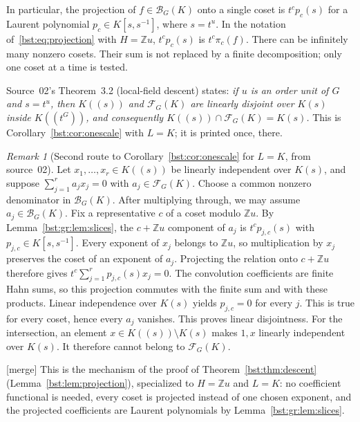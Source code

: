 \documentclass[11pt,letterpaper]{article}
\theoremstyle{definition}
\theoremstyle{remark}
\newtheorem{remark}[theorem]{Remark}
\newcommand{\Z}{\mathbb Z}
\newcommand{\HH}[2]{#1((t^{#2}))}
\newcommand{\BB}[2]{\mathcal B_{#2}(#1)}
\newcommand{\FF}[2]{\mathcal F_{#2}(#1)}
\begin{document}
In particular, the projection of $f\in\BB KG$ onto a single coset is
$t^cp_c(s)$ for a Laurent polynomial $p_c\in K[s,s^{-1}]$, where $s=t^u$.
In the notation of~\eqref{bst:eq:projection} with $H=\Z u$, $t^cp_c(s)$ is
$t^c\pi_c(f)$. There can be infinitely many nonzero cosets. Their sum is not
replaced by a finite decomposition; only one coset at a time is tested.

Source~02's Theorem~3.2 (local-field descent) states: \emph{if $u$ is an order
unit of $G$ and $s=t^u$, then $K((s))$ and $\FF KG$ are linearly disjoint over
$K(s)$ inside $\HH KG$, and consequently $K((s))\cap\FF KG=K(s)$.} This is
Corollary~\ref{bst:cor:onescale} with $L=K$; it is printed once, there.

\begin{remark}[Second route to Corollary~\ref{bst:cor:onescale} for $L=K$, from source~02]\label{bst:gr:rem:cyclicroute}
Let $x_1,\ldots,x_r\in K((s))$ be linearly independent over $K(s)$, and
suppose $\sum_{j=1}^r a_jx_j=0$ with $a_j\in\FF KG$. Choose a common nonzero
denominator in $\BB KG$. After multiplying through, we may assume
$a_j\in\BB KG$. Fix a representative $c$ of a coset modulo $\Z u$. By
Lemma~\ref{bst:gr:lem:slices}, the $c+\Z u$ component of $a_j$ is
$t^cp_{j,c}(s)$ with $p_{j,c}\in K[s,s^{-1}]$. Every exponent of $x_j$ belongs
to $\Z u$, so multiplication by $x_j$ preserves the coset of an exponent of
$a_j$. Projecting the relation onto $c+\Z u$ therefore gives
$t^c\sum_{j=1}^rp_{j,c}(s)x_j=0$. The convolution coefficients are finite
Hahn sums, so this projection commutes with the finite sum and with these
products. Linear independence over $K(s)$ yields $p_{j,c}=0$ for every $j$.
This is true for every coset, hence every $a_j$ vanishes. This proves linear
disjointness. For the intersection, an element $x\in K((s))\setminus K(s)$
makes $1,x$ linearly independent over $K(s)$. It therefore cannot belong to
$\FF KG$.

\textup{[merge]} This is the mechanism of the proof of
Theorem~\ref{bst:thm:descent} (Lemma~\ref{bst:lem:projection}), specialized to
$H=\Z u$ and $L=K$: no coefficient functional is needed, every coset is
projected instead of one chosen exponent, and the projected coefficients are
Laurent polynomials by Lemma~\ref{bst:gr:lem:slices}.
\end{remark}
\end{document}
